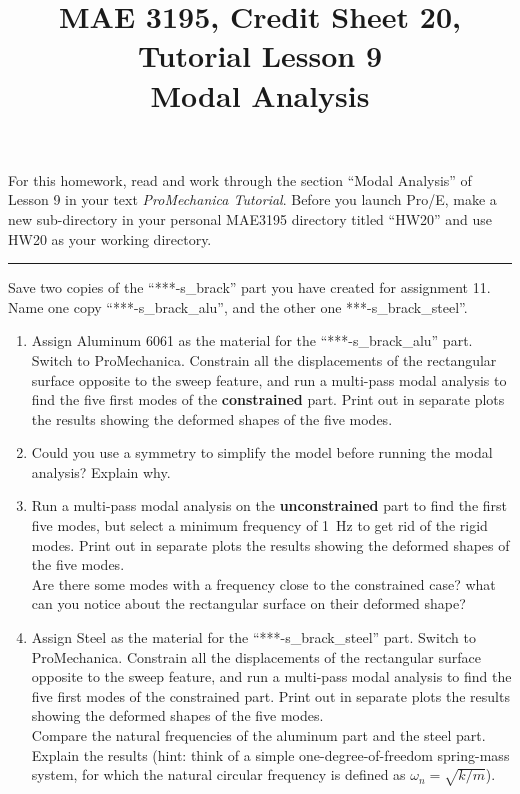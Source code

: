 \documentclass[12pt]{article}
\title{MAE 3195, Credit Sheet 20, Tutorial Lesson 9\\
Modal Analysis}
\date{}
\begin{document}
\maketitle

For this homework, read and work through the section ``Modal Analysis'' of Lesson 9 in your text \textit{ProMechanica Tutorial}. Before you launch Pro/E, make a new sub-directory in your personal MAE3195 directory titled ``HW20'' and use HW20 as your working directory.

\vspace{.25in} \hrule \vspace{.25in}

Save two copies of the ``***-s\_brack'' part you have created for assignment 11. Name one copy ``***-s\_brack\_alu'', and the other one ***-s\_brack\_steel''.\\

\begin{enumerate}
	\item Assign Aluminum 6061 as the material for the ``***-s\_brack\_alu'' part. Switch to ProMechanica. Constrain all the displacements of the rectangular surface opposite to the sweep feature, and run a multi-pass modal analysis to find the five first modes of the \textbf{constrained} part. Print out in separate plots the results showing the deformed shapes of the five modes.
	\vspace{.25in}
	\item Could you use a symmetry to simplify the model before running the modal analysis? Explain why.
	\vspace{.25in}
	\item Run a multi-pass modal analysis on the \textbf{unconstrained} part to find the first five modes, but select a minimum frequency of 1~Hz to get rid of the rigid modes. Print out in separate plots the results showing the deformed shapes of the five modes.\\
Are there some modes with a frequency close to the constrained case? what can you notice about the rectangular surface on their deformed shape?
	\vspace{.25in}
	\item Assign Steel as the material for the ``***-s\_brack\_steel'' part. Switch to ProMechanica. Constrain all the displacements of the rectangular surface opposite to the sweep feature, and run a multi-pass modal analysis to find the five first modes of the constrained part. Print out in separate plots the results showing the deformed shapes of the five modes.\\
	Compare the natural frequencies of the aluminum part and the steel part. Explain the results (hint: think of a simple one-degree-of-freedom spring-mass system, for which the natural circular frequency is defined as $\omega_n = \sqrt{k/m}$).

\end{enumerate}
\end{document}
